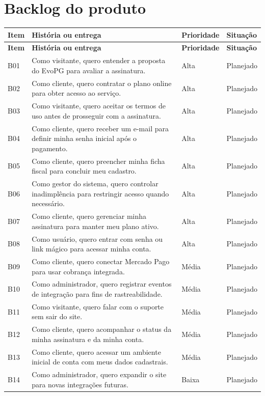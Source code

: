 \documentclass[
  12pt,
  openany,
  oneside,
  a4paper,
  brazil
]{abntex2}
\begin{document}
\section{Backlog do produto}
\begin{longtable}{>{\raggedright\arraybackslash}p{1.8cm} >{\raggedright\arraybackslash}p{7.2cm} >{\raggedright\arraybackslash}p{2.2cm} >{\raggedright\arraybackslash}p{3.3cm}}
\toprule
\textbf{Item} & \textbf{Hist\'oria ou entrega} & \textbf{Prioridade} & \textbf{Situa\c{c}\~ao} \\
\midrule
\endfirsthead
\toprule
\textbf{Item} & \textbf{Hist\'oria ou entrega} & \textbf{Prioridade} & \textbf{Situa\c{c}\~ao} \\
\midrule
\endhead
B01 & Como visitante, quero entender a proposta do EvoPG para avaliar a assinatura. & Alta & Planejado \\
B02 & Como cliente, quero contratar o plano online para obter acesso ao servi\c{c}o. & Alta & Planejado \\
B03 & Como visitante, quero aceitar os termos de uso antes de prosseguir com a assinatura. & Alta & Planejado \\
B04 & Como cliente, quero receber um e-mail para definir minha senha inicial ap\'os o pagamento. & Alta & Planejado \\
B05 & Como cliente, quero preencher minha ficha fiscal para concluir meu cadastro. & Alta & Planejado \\
B06 & Como gestor do sistema, quero controlar inadimpl\^encia para restringir acesso quando necess\'ario. & Alta & Planejado \\
B07 & Como cliente, quero gerenciar minha assinatura para manter meu plano ativo. & Alta & Planejado \\
B08 & Como usu\'ario, quero entrar com senha ou link m\'agico para acessar minha conta. & Alta & Planejado \\
B09 & Como cliente, quero conectar Mercado Pago para usar cobran\c{c}a integrada. & M\'edia & Planejado \\
B10 & Como administrador, quero registrar eventos de integra\c{c}\~ao para fins de rastreabilidade. & M\'edia & Planejado \\
B11 & Como visitante, quero falar com o suporte sem sair do site. & M\'edia & Planejado \\
B12 & Como cliente, quero acompanhar o status da minha assinatura e da minha conta. & M\'edia & Planejado \\
B13 & Como cliente, quero acessar um ambiente inicial de conta com meus dados cadastrais. & M\'edia & Planejado \\
B14 & Como administrador, quero expandir o site para novas integra\c{c}\~oes futuras. & Baixa & Planejado \\
\bottomrule
\end{longtable}
\end{document}
